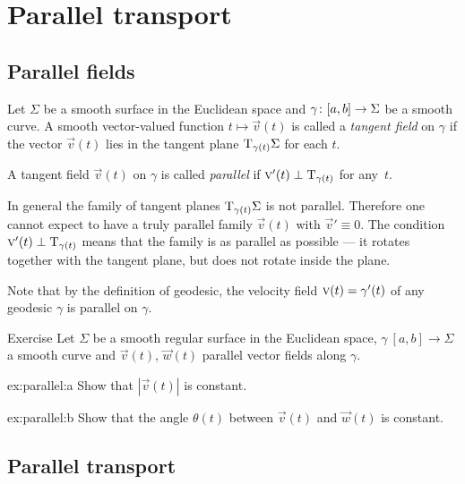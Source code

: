 \chapter{Parallel transport}

\section*{Parallel fields}

Let $\Sigma$ be a smooth surface in the Euclidean space and $\gamma\:[a,b]\z\to \Sigma$ be a smooth curve.
A smooth vector-valued function $t\mapsto {\vec v}(t)$ is called a \emph{tangent field} on $\gamma$ if
the vector ${\vec v}(t)$ lies in the tangent plane $\mathrm{T}_{\gamma(t)}\Sigma$ for each $t$.

A tangent field ${\vec v}(t)$ on $\gamma$ is called \emph{parallel} if ${\textsc v}'(t)\perp\mathrm{T}_{\gamma(t)}$ for any~$t$.

In general the family of tangent planes $\mathrm{T}_{\gamma(t)}\Sigma$ is not parallel.
Therefore one cannot expect to have a truly parallel family ${\vec v}(t)$ with ${\vec v}'\equiv 0$.
The condition ${\textsc v}'(t)\perp\mathrm{T}_{\gamma(t)}$ means that the family is as parallel as possible --- it rotates together with the tangent plane, but does not rotate inside the plane.

Note that by the definition of geodesic, the velocity field ${\vec v}(t)\z=\gamma'(t)$ of any geodesic $\gamma$ is parallel on $\gamma$.

\begin{thm}{Exercise}\label{ex:parallel}
Let $\Sigma$ be a smooth regular surface in the Euclidean space, 
$\gamma\:[a,b]\to \Sigma$ a smooth curve 
and ${\vec v}(t)$, ${\vec w}(t)$ parallel vector fields along $\gamma$.

\begin{subthm}{ex:parallel:a} Show that $|{\vec v}(t)|$ is constant.
\end{subthm}

\begin{subthm}{ex:parallel:b} Show that the angle $\theta(t)$ between ${\vec v}(t)$ and ${\vec w}(t)$ is constant.
\end{subthm}

\end{thm}

\section*{Parallel transport}


